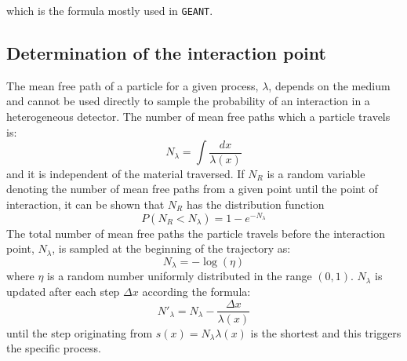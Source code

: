 which is the formula mostly used in {\tt GEANT}.
\subsection{Determination of the interaction point}
The mean free path of a particle for a given process,
$\lambda$, depends on the medium and cannot be used
directly to sample the probability of an interaction in a heterogeneous
detector. The number of mean free paths which a particle travels is:
\[
N_\lambda =\int \frac{dx}{\lambda(x)}
\]
and it is independent of the material traversed. If $N_R$ is
a random variable denoting the number of mean free paths from a given
point until the point of interaction, it can be shown that $N_R$ has the
distribution function
\[
P( N_R < N_\lambda ) = 1-e^{-N_\lambda}
\]
The total number of mean free paths the particle travels before
the interaction point, $N_\lambda$, is sampled at the beginning
of the trajectory as:
\begin{displaymath}
N_\lambda = -\log \left ( \eta \right )
\end{displaymath}
where $\eta$ is a random number uniformly distributed
in the range $(0,1)$.
$N_\lambda$ is updated after each step $\Delta x$ according the formula:
\begin{displaymath}
N'_\lambda=N_\lambda -\frac{\Delta x }{\lambda(x)}
\end{displaymath}
until the step originating from $s(x) = N_\lambda \lambda(x)$ is
the shortest and this triggers the specific process.
